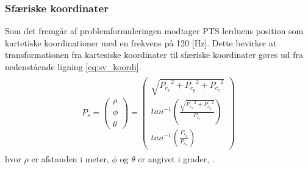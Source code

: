 \subsubsection{Sfæriske koordinater}
Som det fremgår af problemformuleringen modtager PTS lerduens
position som kartetiske koordinationer med en frekvens på 120 [Hz].
Dette bevirker at transformationen fra kartesiske koordinater til
sfæriske koordinater gøres ud fra nedenstående ligning \ref{eq:sv_koordi}.
\begin{align}
\begin{split}
{ P }_{ s } =\left( \begin{matrix} \rho  \\ \phi  \\ \theta  \end{matrix} \right) =\left( \begin{matrix} \sqrt { { { P }_{ c_{ x } } }^{ 2 }+{ { P }_{ c_{ y } } }^{ 2 }+{ { P }_{ c_{ z } } }^{ 2 } }  \\ { tan }^{ -1 }\left( \frac { \sqrt { { { P }_{ c_{ x } } }^{ 2 }+{ { P }_{ c_{ y } } }^{ 2 } }  }{ { P }_{ c_{ z } } }  \right)  \\ { tan }^{ -1 }\left( \frac { { P }_{ c_{ y } } }{ { P }_{ c_{ x } } }  \right)  \end{matrix} \right) %
\label{eq:sv_koordi}
\end{split}
\end{align}
hvor \(\rho\) er afstanden i meter, \(\phi\) og \(\theta\) er angivet i grader, \citep[Kap. 10.6]{adam}.
